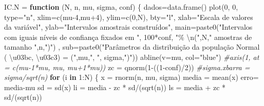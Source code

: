 \documentclass[
]{book}
\newenvironment{Shaded}{\begin{snugshade}}{\end{snugshade}}
\newcommand{\AttributeTok}[1]{\textcolor[rgb]{0.77,0.63,0.00}{#1}}
\newcommand{\CommentTok}[1]{\textcolor[rgb]{0.56,0.35,0.01}{\textit{#1}}}
\newcommand{\ControlFlowTok}[1]{\textcolor[rgb]{0.13,0.29,0.53}{\textbf{#1}}}
\newcommand{\DecValTok}[1]{\textcolor[rgb]{0.00,0.00,0.81}{#1}}
\newcommand{\FunctionTok}[1]{\textcolor[rgb]{0.00,0.00,0.00}{#1}}
\newcommand{\NormalTok}[1]{#1}
\newcommand{\OtherTok}[1]{\textcolor[rgb]{0.56,0.35,0.01}{#1}}
\newcommand{\SpecialCharTok}[1]{\textcolor[rgb]{0.00,0.00,0.00}{#1}}
\newcommand{\StringTok}[1]{\textcolor[rgb]{0.31,0.60,0.02}{#1}}
\begin{document}
\begin{Shaded}
\begin{Highlighting}[]
\NormalTok{IC.N }\OtherTok{=} \ControlFlowTok{function}\NormalTok{ (N, n, mu, sigma, conf) \{}
\NormalTok{  dados}\OtherTok{=}\FunctionTok{data.frame}\NormalTok{()}
  \FunctionTok{plot}\NormalTok{(}\DecValTok{0}\NormalTok{, }\DecValTok{0}\NormalTok{, }
       \AttributeTok{type=}\StringTok{"n"}\NormalTok{, }
       \AttributeTok{xlim=}\FunctionTok{c}\NormalTok{(mu}\DecValTok{{-}4}\NormalTok{,mu}\SpecialCharTok{+}\DecValTok{4}\NormalTok{), }
       \AttributeTok{ylim=}\FunctionTok{c}\NormalTok{(}\DecValTok{0}\NormalTok{,N), }
       \AttributeTok{bty=}\StringTok{"l"}\NormalTok{,}
       \AttributeTok{xlab=}\StringTok{"Escala de valores da variável"}\NormalTok{, }
       \AttributeTok{ylab=}\StringTok{"Intervalos amostrais construídos"}\NormalTok{, }
       \AttributeTok{main=}\FunctionTok{paste0}\NormalTok{(}\StringTok{"Intervalos com iguais níveis de confiança fixados em "}\NormalTok{, }\DecValTok{100}\SpecialCharTok{*}\NormalTok{conf, }\StringTok{"\% }\SpecialCharTok{\textbackslash{}n}\StringTok{("}\NormalTok{,N,}\StringTok{" amostras de tamanho "}\NormalTok{,n,}\StringTok{")"}\NormalTok{) , }
       \AttributeTok{sub=}\FunctionTok{paste0}\NormalTok{(}\StringTok{"Parâmetros da distribuição da população Normal ( \textbackslash{}u03bc, \textbackslash{}u03c3) = ("}\NormalTok{,mu,}\StringTok{", "}\NormalTok{, sigma,}\StringTok{")"}\NormalTok{))}
  \FunctionTok{abline}\NormalTok{(}\AttributeTok{v=}\NormalTok{mu, }\AttributeTok{col=}\StringTok{"blue"}\NormalTok{)}
  \CommentTok{\#axis(1, at = c(mu{-}1*mu, mu, mu+1*mu))}
\NormalTok{zc }\OtherTok{=} \FunctionTok{qnorm}\NormalTok{(}\DecValTok{1}\SpecialCharTok{{-}}\NormalTok{((}\DecValTok{1}\SpecialCharTok{{-}}\NormalTok{conf)}\SpecialCharTok{/}\DecValTok{2}\NormalTok{))}
\CommentTok{\#sigma.xbarra = sigma/sqrt(n)}
\ControlFlowTok{for}\NormalTok{ (i }\ControlFlowTok{in} \DecValTok{1}\SpecialCharTok{:}\NormalTok{N) \{}
\NormalTok{  x }\OtherTok{=} \FunctionTok{rnorm}\NormalTok{(n, mu, sigma)}
\NormalTok{  media }\OtherTok{=} \FunctionTok{mean}\NormalTok{(x)}
\NormalTok{  erro}\OtherTok{=}\NormalTok{ media}\SpecialCharTok{{-}}\NormalTok{mu}
\NormalTok{  sd }\OtherTok{=} \FunctionTok{sd}\NormalTok{(x)}
\NormalTok{  li }\OtherTok{=}\NormalTok{ media }\SpecialCharTok{{-}}\NormalTok{ zc }\SpecialCharTok{*}\NormalTok{ sd}\SpecialCharTok{/}\NormalTok{(}\FunctionTok{sqrt}\NormalTok{(n))}
\NormalTok{  ls }\OtherTok{=}\NormalTok{ media }\SpecialCharTok{+}\NormalTok{ zc }\SpecialCharTok{*}\NormalTok{ sd}\SpecialCharTok{/}\NormalTok{(}\FunctionTok{sqrt}\NormalTok{(n))}

\end{Highlighting}
\end{Shaded}
\end{document}
